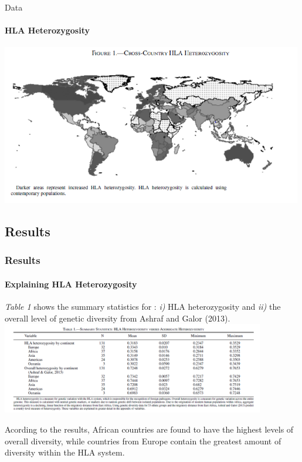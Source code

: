 \documentclass[pdftex,12pt,xcolor=pdftex,table]{beamer}
\theoremstyle{definition}
\theoremstyle{remark}
\numberwithin{equation}{section}
\numberwithin{figure}{section}
\begin{document}
\begin{frame}{Data}
\framesubtitle{HLA Heterozygosity}
\includegraphics[height=7cm]{Figure_1.png}
\centering
\end{frame}



\begin{frame}\section{Results}
\frametitle{Results}
\framesubtitle{Explaining HLA Heterozygosity}
\justifying
\textit{Table 1} shows the summary statistics for : \textit{i)} HLA heterozygosity and \textit{ii)} the overall level of genetic diversity from Ashraf and Galor (2013).\\ 
\includegraphics[height=4cm]{Table_1.PNG}

\justifying
Acording to the results, African countries are found to have the highest levels of overall diversity, while countries from Europe contain the greatest amount of diversity within the HLA system.
\end{frame}
\end{document}
